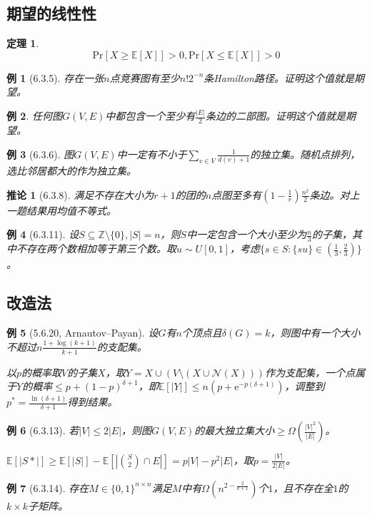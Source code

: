 \documentclass[landscape, a4paper]{article}
\theoremstyle{compact}
\newtheorem{theorem}{定理}
\newtheorem{example}{例}
\newtheorem{corollary}{推论}
\def\le{\leqslant}
\def\ge{\geqslant}
\def\Pr#1{\text{Pr}[{#1}]}
\def\E#1{\mathbb{E}[{#1}]}
\begin{document}
\begin{multicols}{3}
\subsection{期望的线性性}
\begin{theorem}
	$$\Pr{X \ge \E{X}} > 0, \Pr{X \le \E{X}} > 0$$
\end{theorem}
\begin{example}[6.3.5]
	存在一张$n$点竞赛图有至少$n!2^{-n}$条Hamilton路径。\textit{证明这个值就是期望。}
\end{example}
\begin{example}
	任何图$G(V, E)$中都包含一个至少有$\frac{|E|}{2}$条边的二部图。\textit{证明这个值就是期望。}
\end{example}
\begin{example}[6.3.6]
	图$G(V, E)$中一定有不小于$\sum_{v \in V}\frac{1}{d(v) + 1}$的独立集。\textit{随机点排列，选比邻居都大的作为独立集。}
\end{example}
\begin{corollary}[6.3.8]
	满足不存在大小为$r+1$的团的$n$点图至多有$\left( 1 - \frac1r \right)\frac{n^2}{2}$条边。\textit{对上一题结果用均值不等式。}
\end{corollary}
\begin{example}[6.3.11]
	设$S \subseteq \mathbb Z \setminus \{0\}, |S| = n$，则$S$中一定包含一个大小至少为$\frac{n}{3}$的子集，其中不存在两个数相加等于第三个数。\textit{取$u \sim U[0, 1]$，考虑$\{s \in S: \{su\} \in (\frac13, \frac23)\}$。}
\end{example}
\subsection{改造法}
\begin{example}[5.6.20, Arnautov–Payan]
	设$G$有$n$个顶点且$\delta(G) = k$，则图中有一个大小不超过$n\frac{1 + \log(k+1)}{k+1}$的支配集。
	
	\textit{以$p$的概率取$V$的子集$X$，取$Y = X \cup (V \setminus (X \cup \mathcal N(X)) )$作为支配集，一个点属于$Y$的概率$\le p + (1-p)^{\delta + 1}$，即$\E{|Y|} \le n(p + \text{e}^{-p(\delta+1)})$，调整到$p^* = \frac{\ln(\delta+1)}{\delta+1}$得到结果。}
\end{example}
\begin{example}[6.3.13]
	若$|V| \le 2|E|$，则图$G(V, E)$的最大独立集大小$\ge \Omega\left(\frac{|V|^2}{|E|}\right)$。
	
	$\E{|S*|} \ge \E{|S|} - \E{|\binom{S}{2} \cap E|} = p|V| - p^2|E|$，取$p = \frac{|V|}{2|E|}$。
\end{example}
\begin{example}[6.3.14]
	存在$M \in \{0, 1\}^{n \times n}$满足$M$中有$\Omega(n^{2 - \frac{2}{k+1}})$个$1$，且不存在全$1$的$k \times k$子矩阵。
	

\end{example}
\end{multicols}
\end{document}
